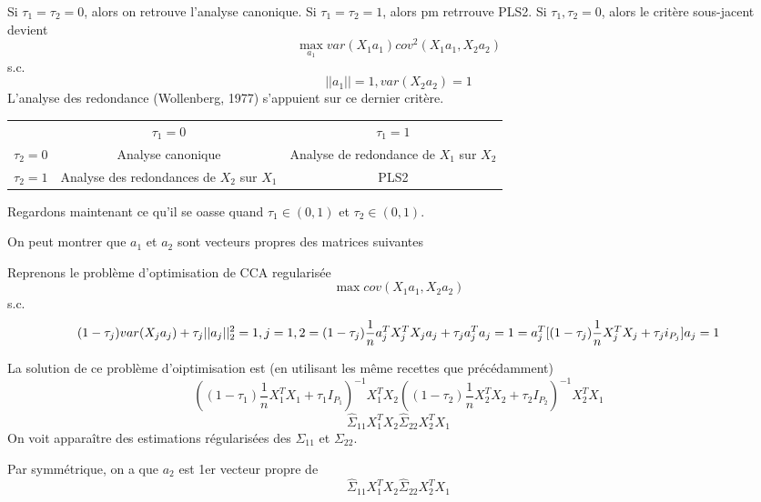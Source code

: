 \documentclass{article}
\begin{document}
Si $\tau_1=\tau_2=0$, alors on retrouve l'analyse canonique.
Si $\tau_1=\tau_2=1$, alors pm retrrouve PLS2.
Si $\tau_1, \tau_2=0$, alors le crit\`ere sous-jacent devient
\begin{equation}
\max_{a_1} var(X_1a_1)cov^2(X_1a_1, X_2a_2)
\end{equation}
s.c.
\begin{equation}
||a_1||=1, var(X_2a_2)=1
\end{equation}
L'analyse des redondance (Wollenberg, 1977) s'appuient sur ce dernier crit\`ere.

\begin{table}
\begin{tabular}{ccc}
 & $\tau_1=0$ & $\tau_1=1$ \\
 $\tau_2=0$ & Analyse canonique & Analyse de redondance de $X_1$ sur $X_2$ \\
 $\tau_2=1$ & Analyse des redondances de $X_2$ sur $X_1$ & PLS2
\end{tabular}
\end{table}

Regardons maintenant ce qu'il se oasse quand $\tau_1\in(0,1)$ et $\tau_2\in(0,1)$.

On peut montrer que $a_1$ et $a_2$ sont vecteurs propres des matrices suivantes

Reprenons le probl\`eme d'optimisation de CCA regularis\'ee
\begin{equation}
\max cov(X_1a_1, X_2a_2)
\end{equation}
s.c.
\begin{equation}
(1-\tau_j)var(X_ja_j)+\tau_j||a_j||^2_2=1, j=1,2\\
=(1-\tau_j)\frac{1}{n}a_j^TX_j^TX_ja_j+\tau_ja_j^Ta_j=1
=a_j^T[(1-\tau_j)\frac{1}{n}X_j^TX_j+\tau_j i_{P_j}]a_j=1
\end{equation}

La solution de ce probl\`eme d'oiptimisation est (en utilisant les m\^eme recettes que pr\'ec\'edamment)
\begin{equation}
((1-\tau_1)\frac{1}{n}X_1^TX_1+\tau_1I_{P_1})^{-1}X_1^TX_2((1-\tau_2)\frac{1}{n}X_2^TX_2+\tau_2I_{P_2})^{-1}X_2^TX_1
\end{equation}
\begin{equation}
\hat{\Sigma}_{11}X_1^TX_2\hat{\Sigma}_{22}X_2^TX_1
\end{equation}
On voit appara\^itre des estimations r\'egularis\'ees des $\Sigma_{11}$ et $\Sigma_{22}$.

Par symm\'etrique, on a que $a_2$ est 1er vecteur propre de 
\begin{equation}
\hat{\Sigma}_{11}X_1^TX_2\hat{\Sigma}_{22}X_2^TX_1
\end{equation}
\end{document}
